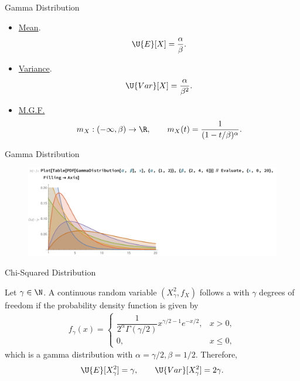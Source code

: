 \begin{frame}{Gamma Distribution}

\justifying
{} 
\begin{itemize}
	\justifying
	\item \underline{Mean}. 
	\begin{align*}
	\U{E}[X] = \frac{\alpha}{\beta}.
	\end{align*}
	\item \underline{Variance}.
	\begin{align*}
	\U{Var}[X] = \frac{\alpha}{\beta^2}.
	\end{align*}
	\item \underline{M.G.F.}
	\begin{align*}
	m_X: (-\infty, \beta) \rightarrow \R, \qquad m_X(t) = \frac{1}{(1-t/\beta)^{\alpha}}.
	\end{align*}
\end{itemize}

\end{frame}

\begin{frame}{Gamma Distribution}

\begin{figure}[htbp]
	\centering
	\includegraphics[width=\linewidth]{./images/rc2fig3.pdf}
\end{figure}

\end{frame}

\begin{frame}{Chi-Squared Distribution}

\justifying
{} Let $\gamma\in \N$. A continuous random variable $(X_{\gamma}^2, f_X)$ follows a  with $\gamma$ degrees of freedom if the probability density function is given by
\begin{align*}
f_{\gamma}(x) = \left\{
\begin{array}{ll}
\dfrac{1}{2^{\alpha}\Gamma(\gamma/2)} x^{\gamma/2-1} e^{-x/2}, & x > 0, \\
0, & x\leq 0,
\end{array}
\right.
\end{align*}
which is a gamma distribution with $\alpha = \gamma/2, \beta = 1/2$. Therefore,
\begin{align*}
\U{E}[X^2_{\gamma}] = \gamma, \qquad \U{Var}[X_{\gamma}^2] = 2\gamma.
\end{align*}


\end{frame}


